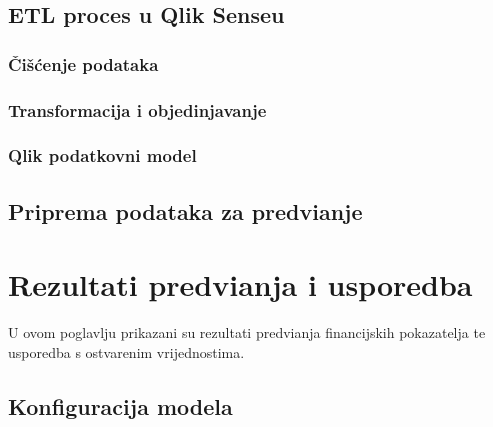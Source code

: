 \documentclass[zavrsnirad]{fer}
\begin{document}
\section{ETL proces u Qlik Senseu}
\label{sec:etl_proces}


\subsection{\v{C}i\v{s}\'{c}enje podataka}
\label{subsec:ciscenje}


\subsection{Transformacija i objedinjavanje}
\label{subsec:transformacija}


\subsection{Qlik podatkovni model}
\label{subsec:qlik_model_podataka}


\section{Priprema podataka za predvi\dj anje}
\label{sec:priprema_predvidjanje}



\chapter{Rezultati predvi\dj anja i usporedba}
\label{pog:rezultati}

U ovom poglavlju prikazani su rezultati predvi\dj anja financijskih pokazatelja te usporedba s ostvarenim vrijednostima.

\section{Konfiguracija modela}
\label{sec:konfiguracija}
\end{document}
